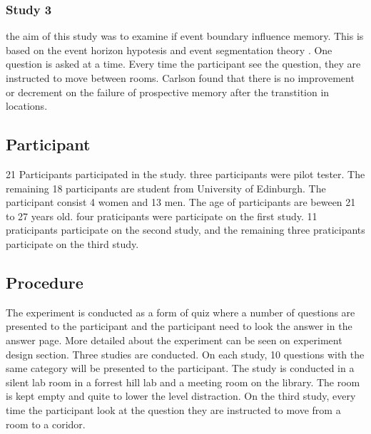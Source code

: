 \subsubsection{Study 3}
the aim of this study was to examine if event boundary influence memory. This is based on the event horizon hypotesis \citep{Radvansky2010} and
event segmentation theory \citep{Kurby2008}. One question is asked at a time.
Every time the participant see the question, they are instructed to move between rooms.
Carlson found that there is no improvement or decrement on the failure of prospective memory after the transtition in locations.

%

\subsection{Participant}
21 Participants participated in the study. three participants were pilot tester.
The remaining 18 participants are student from University of Edinburgh.
The participant consist 4 women and 13 men. The age of participants are beween 21 to 27 years old.
four praticipants were participate on the first study. 11 praticipants participate on the second study,
and the remaining three praticipants participate on the third study.


\subsection{Procedure}
The experiment is conducted as a form of quiz where a number of questions are presented to the participant and the participant need to look the answer in the answer page.
More detailed about the experiment can be seen on experiment design section.
Three studies are conducted. On each study, 10 questions with the same category will be presented to the participant. The study is conducted in a silent lab
 room in a forrest hill lab and a meeting room on the library. The room is kept empty and quite to lower the level distraction.
On the third study, every time the participant look at the question they are instructed to move from a room to a coridor.

